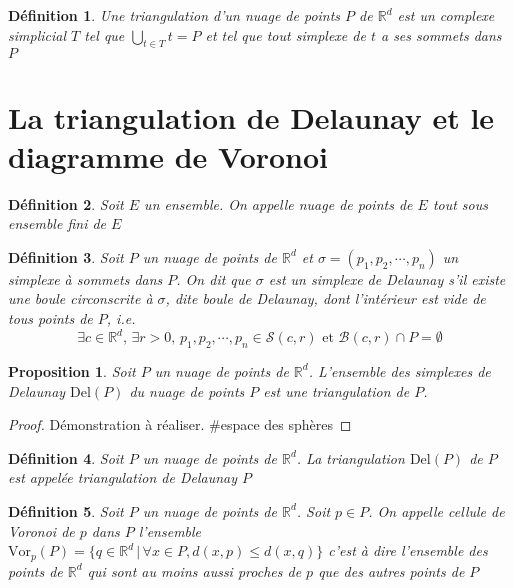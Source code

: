 \documentclass{report}
\newcommand{\R}{\mathbb{R}}
\newcommand{\Vor}{\mathrm{Vor}}
\newcommand{\Del}{\mathrm{Del}}
\newtheorem{definition}{Définition}
\newtheorem{prop}{Proposition}
\theoremstyle{remark}
\begin{document}
\begin{definition}
	Une \textnormal{triangulation} d'un nuage de points $P$ de $\R^d$ est un complexe simplicial $T$ tel que $\bigcup\limits_{t\in T}t = P$ et tel que tout simplexe de $t$ a ses sommets dans $P$
\end{definition}

\section{La triangulation de Delaunay et le diagramme de Voronoi}
\begin{definition}
	Soit $E$ un ensemble. On appelle \textnormal{nuage de points} de $E$ tout sous ensemble fini de $E$
\end{definition}

\begin{definition}
	Soit $P$ un nuage de points de $\R^d$ et $\sigma = (p_1, p_2, \cdots, p_n)$ un simplexe à sommets dans $P$. On dit que $\sigma$ est un \textnormal{simplexe de Delaunay} s'il existe une boule circonscrite à $\sigma$, dite \textnormal{boule de Delaunay}, dont l'intérieur est vide de tous points de $P$, i.e.
	$$\exists c\in \R^d, \, \exists r > 0, \, p_1, p_2, \cdots, p_n \in \mathcal S(c, r) \text{ et }\mathcal B(c, r)\cap P = \emptyset$$
\end{definition}

\begin{prop}
	Soit $P$ un nuage de points de $\R^d$. L'ensemble des simplexes de Delaunay $\Del(P)$ du nuage de points $P$ est une triangulation de $P$.
\end{prop}

\begin{proof}
	Démonstration à réaliser. \#espace des sphères
\end{proof}

\begin{definition}
	Soit $P$ un nuage de points de $\R^d$. La triangulation $\Del(P)$  de $P$ est appelée \textnormal{triangulation de Delaunay} $P$
\end{definition}

\begin{definition}
	Soit $P$ un nuage de points de $\R^d$. Soit $p\in P$. On appelle \textnormal{cellule de Voronoi} de $p$ dans $P$ l'ensemble $\Vor_p(P) = \{q\in \R^d\,|\,\forall x\in P, d(x, p) \leq d(x, q)\}$ c'est à dire l'ensemble des points de $\R^d$ qui sont au moins aussi proches de $p$ que des autres points de $P$
\end{definition}
\end{document}
